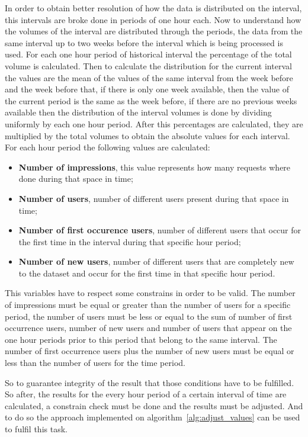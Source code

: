 In order to obtain better resolution of how the data is distributed on the
interval, this intervals are broke done in periods of one hour each. Now to
understand how the volumes of the interval are distributed through the periods,
the data from the same interval up to two weeks before the interval which is
being processed is used. For each one hour period of historical interval the
percentage of the total volume is calculated. Then to calculate the distribution
for the current interval the values are the mean of the values of the same interval from the week before
and the week before that, if there is only one week available, then the value of
the current period is the same as the week before, if there are no previous
weeks available then the distribution of the interval volumes is done by
dividing uniformly by each one hour period. After this percentages are
calculated, they are multiplied by the total volumes to obtain the absolute
values for each interval.
\\
For each hour period the following values are calculated:
\begin{itemize}
  \item \textbf{Number of impressions}, this value represents how many requests
    where done during that space in time;
  \item \textbf{Number of users}, number of different users present during that
    space in time;
  \item \textbf{Number of first occurence users}, number of different users that
    occur for the first time in the interval during that specific hour period;
  \item \textbf{Number of new users}, number of different users that are
    completely new to the dataset and occur for the first time in that specific
    hour period.
\end{itemize}

This variables have to respect some constrains in order to be valid. The number
of impressions must be equal or greater than the number of users for a specific
period, the number of users must be less or equal to the sum of number of first
occurrence users, number of new users and number of users that appear on the one
hour periods prior to this period that belong to the same interval. The number
of first occurrence users plus the number of new users must be equal or less
than the number of users for the time period.

So to guarantee integrity of the result that those conditions have to be
fulfilled. So after, the results for the every hour period of a certain interval
of time are calculated, a constrain check must be done and the results must be
adjusted. And to do so the approach implemented on
algorithm~\ref{alg:adjust_values} can be used to fulfil this task.

